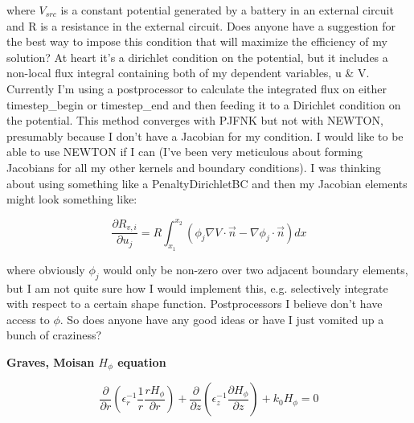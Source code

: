 \documentclass[12pt]{article}
\begin{document}
where $V_{src}$ is a constant potential generated by a battery in an external circuit and  R is a resistance in the external circuit. Does anyone have a suggestion for the best way to impose this condition that will maximize the efficiency of my solution? At heart it's a dirichlet condition on the potential, but it includes a non-local flux integral containing both of my dependent variables, u \& V. Currently I'm using a postprocessor to calculate the integrated flux on either timestep\_begin or timestep\_end and then feeding it to a Dirichlet condition on the potential. This method converges with PJFNK but not with NEWTON, presumably because I don't have a Jacobian for my condition. I would like to be able to use NEWTON if I can (I've been very meticulous about forming Jacobians for all my other kernels and boundary conditions). I was thinking about using something like a PenaltyDirichletBC and then my Jacobian elements might look something like:

\begin{equation}
\frac{\partial R_{v,i}}{\partial u_j} = R \int_{x_1}^{x_2}\left(\phi_j\nabla V\cdot\vec{n} -\nabla\phi_j\cdot\vec{n}\right)dx
\end{equation}

where obviously $\phi_j$ would only be non-zero over two adjacent boundary
elements, but I am not quite sure how I would implement this, e.g. selectively
integrate with respect to a certain shape function. Postprocessors I believe
don't have access to $\phi$. So does anyone have any good ideas or have I just
vomited up a bunch of craziness?

\textbf{Graves, Moisan $H_{\phi}$ equation}

\begin{equation}
  \frac{\partial}{\partial r}\left( \epsilon_r^{-1}
  \frac{1}{r}\frac{rH_{\phi}}{\partial r}\right) + \frac{\partial}{\partial
    z}\left(\epsilon_z^{-1} \frac{\partial H_{\phi}}{\partial z}\right) +
  k_0H_{\phi} = 0
\end{equation}
\end{document}
